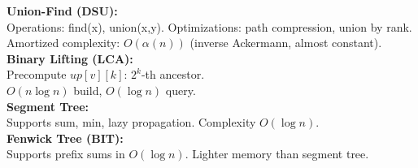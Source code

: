 \textbf{Union-Find (DSU):} \\[1mm]
Operations: find(x), union(x,y). Optimizations: path compression, union by rank. \\
Amortized complexity: $O(\alpha(n))$ (inverse Ackermann, almost constant). \\

\textbf{Binary Lifting (LCA):} \\[1mm]
Precompute $up[v][k]$: $2^k$-th ancestor. \\
$O(n\log n)$ build, $O(\log n)$ query. \\

\textbf{Segment Tree:} \\[1mm]
Supports sum, min, lazy propagation. Complexity $O(\log n)$. \\

\textbf{Fenwick Tree (BIT):} \\[1mm]
Supports prefix sums in $O(\log n)$. Lighter memory than segment tree. \\